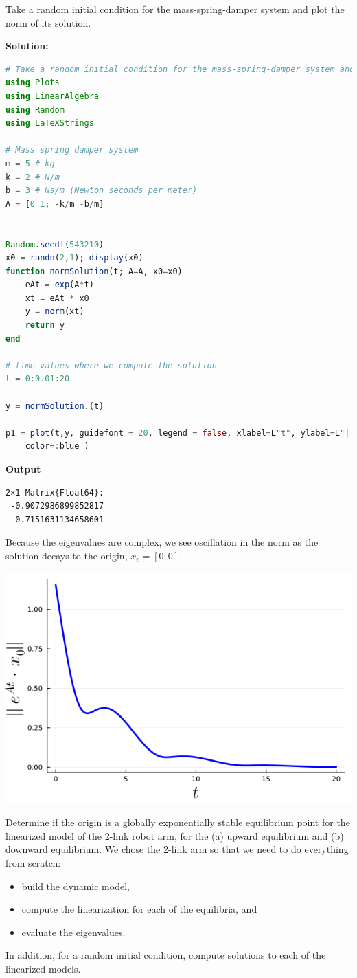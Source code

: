 \bigskip
\begin{example} 
\label{ex:RandomInitialConditionMassSpringDamper}
Take a random initial condition for the mass-spring-damper system and plot the norm of its solution.    
\end{example}
\textbf{Solution:}
\begin{lstlisting}[language=Julia,style=mystyle]
# Take a random initial condition for the mass-spring-damper system and plot the norm of its solution.   
using Plots
using LinearAlgebra
using Random
using LaTeXStrings

# Mass spring damper system
m = 5 # kg
k = 2 # N/m
b = 3 # Ns/m (Newton seconds per meter)
A = [0 1; -k/m -b/m]


Random.seed!(543210)
x0 = randn(2,1); display(x0)
function normSolution(t; A=A, x0=x0)
    eAt = exp(A*t)
    xt = eAt * x0
    y = norm(xt)
    return y
end

# time values where we compute the solution
t = 0:0.01:20

y = normSolution.(t)

p1 = plot(t,y, guidefont = 20, legend = false, xlabel=L"t", ylabel=L"||e^{At}\cdot x_0 ||", lw=3, 
    color=:blue )
\end{lstlisting}
\textbf{Output} 
\begin{verbatim}
2×1 Matrix{Float64}:
 -0.9072986899852817
  0.7151631134658601
\end{verbatim}
Because the eigenvalues are complex, we see oscillation in the norm as the solution decays to the origin, $x_e=[0; 0]$.
\begin{center}
    \includegraphics[width=0.6\columnwidth]{graphics/Chap09/NormSolutionX0randomMassSpringDamper.png}
\end{center}

\Qed
\bigskip


\begin{example} Determine if the origin is a globally exponentially stable equilibrium point for the linearized model of the 2-link robot arm, for the (a) upward equilibrium and (b) downward equilibrium. We chose the 2-link arm so that we need to do everything from scratch:
\begin{itemize}
    \item build the dynamic model,
    \item compute the linearization for each of the equilibria, and
    \item evaluate the eigenvalues. 
\end{itemize}
In addition, for a random initial condition, compute solutions to each of the linearized models.
\end{example}

